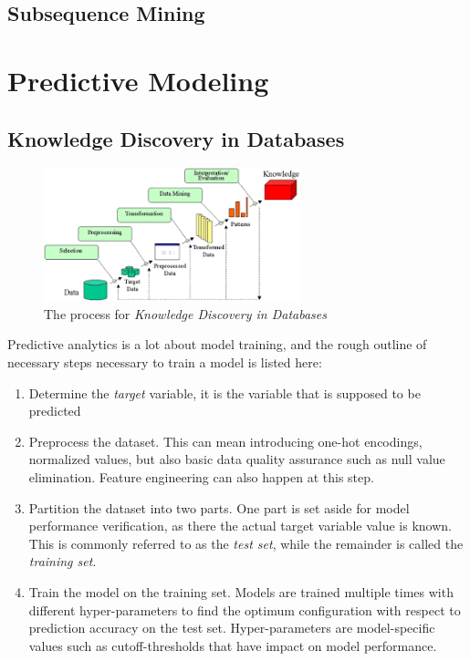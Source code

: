 \subsection{Subsequence Mining}

\section{Predictive Modeling}
\subsection{Knowledge Discovery in Databases}
\begin{figure}
	\centering
	\includegraphics[width=20em]{gfx/kdd_process}
	\caption{The process for \textit{Knowledge Discovery in Databases}}
	\label{fig:kdd_process}
\end{figure}
Predictive analytics is a lot about model training, and the rough outline of necessary steps necessary to train a model is listed here:
\begin{enumerate}
	\item Determine the \textit{target} variable, it is the variable that is supposed to be predicted
	\item Preprocess the dataset. This can mean introducing one-hot encodings, normalized values, but also basic data quality assurance such as null value elimination. Feature engineering can also happen at this step.
	\item Partition the dataset into two parts. One part is set aside for model performance verification, as there the actual target variable value is known. This is commonly referred to as the \textit{test set}, while the remainder is called the \textit{training set}.
	\item Train the model on the training set. Models are trained multiple times with different hyper-parameters to find the optimum configuration with respect to prediction accuracy on the test set. Hyper-parameters are model-specific values such as cutoff-thresholds that have impact on model performance.
\end{enumerate}

